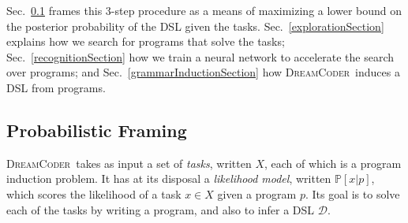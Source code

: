 \documentclass{article}
\newcommand{\system}{\textsc{DreamCoder}~}
\newcommand{\probability}{\mathds{P}} %
\begin{document}
      

    


Sec.~\ref{mathematicalFraming} frames this 3-step procedure as
a means of maximizing a lower bound on the posterior probability of the DSL given the tasks.
Sec.~\ref{explorationSection} explains how we search for programs that solve the tasks;
Sec.~\ref{recognitionSection} how we train a neural network to accelerate the search over programs; and
Sec.~\ref{grammarInductionSection}  how \system induces a DSL from programs.

\subsection{Probabilistic Framing}\label{mathematicalFraming}

\system takes as input a set of \emph{tasks}, written $X$, each of which is a program induction problem.
It has at its disposal a \emph{likelihood model}, written $\probability[x|p]$, which scores the likelihood of a task $x\in X$ given a program $p$.
Its goal is to solve each of the tasks by writing a program,
and also to infer a DSL $\mathcal{D}$.
\end{document}
